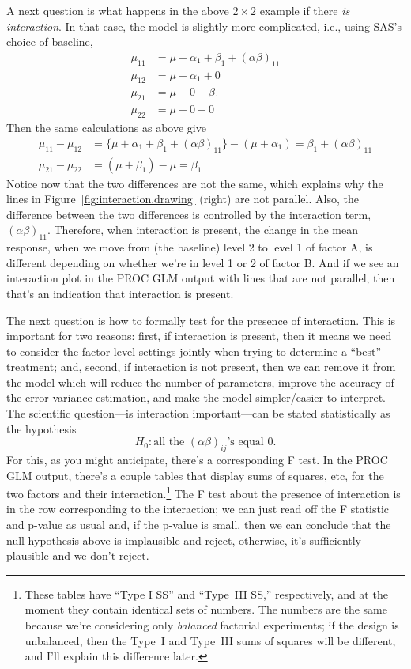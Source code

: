 \documentclass[a4paper, 12pt]{article}
\theoremstyle{plain}
\theoremstyle{definition}
\theoremstyle{remark}
\begin{document}
A next question is what happens in the above $2 \times 2$ example if there {\em is interaction}.  In that case, the model is slightly more complicated, i.e., using SAS's choice of baseline, 
\begin{align*}
\mu_{11} & = \mu + \alpha_1 + \beta_1 + (\alpha\beta)_{11} \\
\mu_{12} & = \mu + \alpha_1 + 0\\
\mu_{21} & = \mu + 0 + \beta_1 \\
\mu_{22} & = \mu + 0 + 0
\end{align*}
Then the same calculations as above give
\begin{align}
\mu_{11} - \mu_{12} & = \{\mu + \alpha_1 + \beta_1 + (\alpha\beta)_{11}\} - (\mu +\alpha_1) = \beta_1 + (\alpha\beta)_{11} \tag{$B=1$} \\
\mu_{21} - \mu_{22} & = (\mu + \beta_1) - \mu = \beta_1 \tag{$B=2$}
\end{align}
Notice now that the two differences are not the same, which explains why the lines in Figure~\ref{fig:interaction.drawing} (right) are not parallel.  Also, the difference between the two differences is controlled by the interaction term, $(\alpha\beta)_{11}$.  Therefore, when interaction is present, the change in the mean response, when we move from (the baseline) level 2 to level 1 of factor A, is different depending on whether we're in level 1 or 2 of factor B.  And if we see an interaction plot in the PROC GLM output with lines that are not parallel, then that's an indication that interaction is present.  

The next question is how to formally test for the presence of interaction.  This is important for two reasons: first, if interaction is present, then it means we need to consider the factor level settings jointly when trying to determine a ``best'' treatment; and, second, if interaction is not present, then we can remove it from the model which will reduce the number of parameters, improve the accuracy of the error variance estimation, and make the model simpler/easier to interpret.  The scientific question---is interaction important---can be stated statistically as the hypothesis
\[ H_0: \text{all the $(\alpha\beta)_{ij}$'s equal 0}. \]
For this, as you might anticipate, there's a corresponding F test.  In the PROC GLM output, there's a couple tables that display sums of squares, etc, for the two factors and their interaction.\footnote{These tables have ``Type I SS'' and ``Type~III SS,'' respectively, and at the moment they contain identical sets of numbers.  The numbers are the same because we're considering only {\em balanced} factorial experiments; if the design is unbalanced, then the Type~I and Type~III sums of squares will be different, and I'll explain this difference later.}  The F test about the presence of interaction is in the row corresponding to the interaction; we can just read off the F statistic and p-value as usual and, if the p-value is small, then we can conclude that the null hypothesis above is implausible and reject, otherwise, it's sufficiently plausible and we don't reject.  
\end{document}
